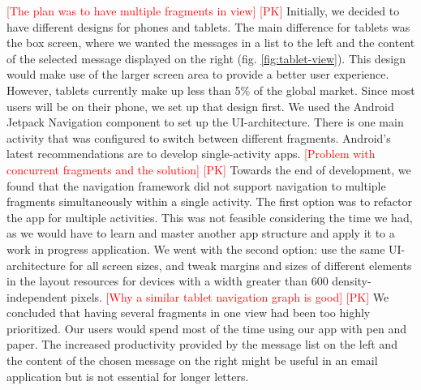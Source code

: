 \documentclass[acmlarge, review=false, screen=true]{acmart}
\begin{document}
      \textcolor{red}{[The plan was to have multiple fragments in view] [PK]} \newline
      Initially, we decided to have different designs for phones and tablets. The main difference for tablets was the box screen, where we wanted the messages in a list to the left and the content of the selected message displayed on the right (fig. \ref{fig:tablet-view}). This design would make use of the larger screen area to provide a better user experience. However, tablets currently make up less than 5\% of the global market\cite{statcounter}. Since most users will be on their phone, we set up that design first. We used the Android Jetpack Navigation component to set up the UI-architecture\cite{navigation}. There is one main activity that was configured to switch between different fragments. Android's latest recommendations are to develop single-activity apps\cite{singleactivity}. 
\newline\newline
      \textcolor{red}{[Problem with concurrent fragments and the solution] [PK]} \newline
      Towards the end of development, we found that the navigation framework did not support navigation to multiple fragments simultaneously within a single activity. The first option was to refactor the app for multiple activities. This was not feasible considering the time we had, as we would have to learn and master another app structure and apply it to a work in progress application. We went with the second option: use the same UI-architecture for all screen sizes, and tweak margins and sizes of different elements in the layout resources for devices with a width greater than 600 density-independent pixels. 
\newline\newline
      \textcolor{red}{[Why a similar tablet navigation graph is good] [PK]} \newline
      We concluded that having several fragments in one view had been too highly prioritized. Our users would spend most of the time using our app with pen and paper. The increased productivity provided by the message list on the left and the content of the chosen message on the right might be useful in an email application but is not essential for longer letters. 
\end{document}
